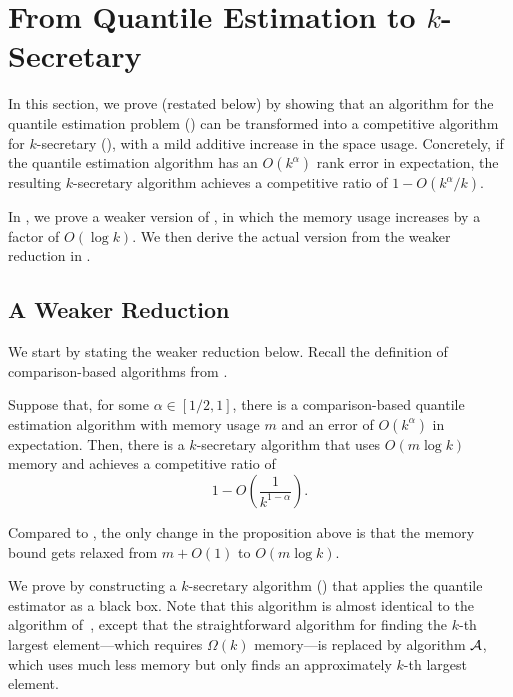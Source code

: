 \section{From Quantile Estimation to $k$-Secretary}\label{section.3}
In this section, we prove  (restated below) by showing that an algorithm for the quantile estimation problem () can be transformed into a competitive algorithm for $k$-secretary (), with a mild additive increase in the space usage. Concretely, if the quantile estimation algorithm has an $O(k^{\alpha})$ rank error in expectation, the resulting $k$-secretary algorithm achieves a competitive ratio of $1 - O(k^{\alpha} / k)$.

\reduction*

In , we prove a weaker version of , in which the memory usage increases by a factor of $O(\log k)$. We then derive the actual version from the weaker reduction in .

\subsection{A Weaker Reduction}\label{sec:reduction-weaker}
We start by stating the weaker reduction below. Recall the definition of comparison-based algorithms from .

\begin{proposition}\label{prop:reduction-weaker}
    Suppose that, for some $\alpha \in [1/2, 1]$, there is a comparison-based quantile estimation algorithm with memory usage $m$ and an error of $O(k^{\alpha})$ in expectation. Then, there is a $k$-secretary algorithm that uses $O(m \log k)$ memory and achieves a competitive ratio of
    \[
        1 -O\left(\frac{1}{k^{1 - \alpha}}\right).
    \]
\end{proposition}

Compared to , the only change in the proposition above is that the memory bound gets relaxed from $m + O(1)$ to $O(m\log k)$.

We prove  by constructing a $k$-secretary algorithm () that applies the quantile estimator as a black box. Note that this algorithm is almost identical to the algorithm of~\cite{Kleinberg05}, except that the straightforward algorithm for finding the $k$-th largest element---which requires $\Omega(k)$ memory---is replaced by algorithm $\mathcal{A}$, which uses much less memory but only finds an approximately $k$-th largest element.

